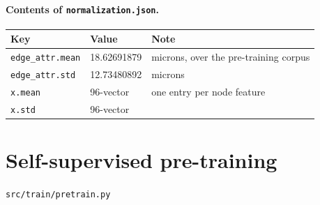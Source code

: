 \documentclass[10pt,a4paper]{article}
\begin{document}
\paragraph{Contents of \texttt{normalization.json}.}

\begin{longtable}{@{}p{4.6cm}p{4.2cm}p{6.8cm}@{}}
\toprule
\textbf{Key} & \textbf{Value} & \textbf{Note} \\
\midrule \endhead
\texttt{edge\_attr.mean} & 18.62691879 & microns, over the pre-training corpus \\
\texttt{edge\_attr.std} & 12.73480892 & microns \\
\texttt{x.mean} & 96-vector & one entry per node feature \\
\texttt{x.std} & 96-vector & \\
\bottomrule
\end{longtable}

\newpage
\section{Self-supervised pre-training}
\noindent\texttt{src/train/pretrain.py}
\end{document}
